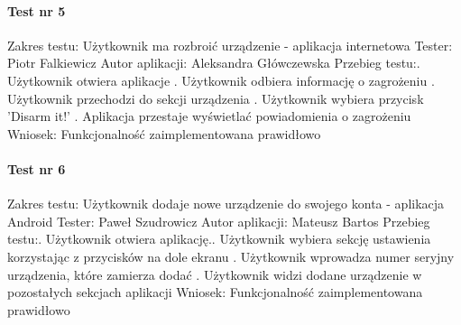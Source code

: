  \paragraph{Test nr 5}
Zakres testu:\newline
Użytkownik ma rozbroić urządzenie - aplikacja internetowa\newline
Tester: Piotr Falkiewicz \newline
Autor aplikacji: Aleksandra Główczewska \newline
Przebieg testu:. Użytkownik otwiera aplikacje . Użytkownik odbiera informację o zagrożeniu . Użytkownik przechodzi do sekcji urządzenia . Użytkownik wybiera przycisk 'Disarm it!' . Aplikacja przestaje wyświetlać powiadomienia o zagrożeniu \newline
Wniosek:\newline
Funkcjonalność zaimplementowana prawidłowo\newline
\newline


\paragraph{Test nr 6}
Zakres testu:\newline
Użytkownik dodaje nowe urządzenie do swojego konta - aplikacja Android\newline
Tester: Paweł Szudrowicz \newline
Autor aplikacji: Mateusz Bartos \newline
Przebieg testu:. Użytkownik otwiera aplikację.. Użytkownik wybiera sekcję ustawienia korzystając z przycisków na dole ekranu . Użytkownik wprowadza numer seryjny urządzenia, które zamierza dodać . Użytkownik widzi dodane urządzenie w pozostałych sekcjach aplikacji\newline
Wniosek:\newline
Funkcjonalność zaimplementowana prawidłowo\newline
\newline

